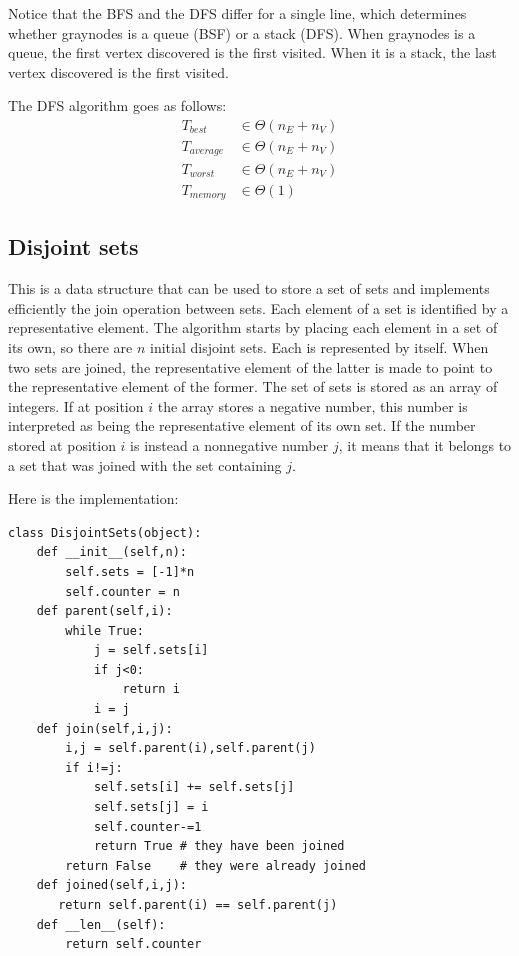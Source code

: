 \documentclass[justified,sixbynine]{tufte-book}
\def\ft{\small\tt}
\theoremstyle{plain}%
\theoremstyle{definition}
\theoremstyle{remark}
\begin{document}
\begin{fullwidth}
Notice that the BFS and the DFS differ for a single line, which determines whether graynodes is a queue (BSF) or a stack (DFS). When graynodes is a queue, the first vertex discovered is the first visited. When it is a stack, the last vertex discovered is the first visited.

The DFS algorithm goes as follows:
\begin{align}
T_{best} &\in \Theta (n_E+n_V) \\
T_{average} &\in \Theta (n_E+n_V) \\
T_{worst} &\in \Theta (n_E+n_V) \\
T_{memory} &\in \Theta (1)
\end{align}

\subsection{Disjoint sets}


This is a data structure that can be used to store a set of sets and implements efficiently the join operation between sets.
Each element of a set is identified by a representative element. The algorithm starts by placing each element in a set of its own, so there are $n$ initial disjoint sets. Each is represented by itself. When two sets are joined, the representative element of the latter is made to point to the representative element of the former. The set of sets is stored as an array of integers. If at position $i$ the array stores a negative number, this number is interpreted as being the representative element of its own set. If the number stored at position $i$ is instead a nonnegative number $j$, it means that it belongs to a set that was joined with the set containing $j$.

Here is the implementation:


\begin{lstlisting}[caption={in file: {\ft nlib.py}}]
class DisjointSets(object):
    def __init__(self,n):
        self.sets = [-1]*n
        self.counter = n
    def parent(self,i):
        while True:
            j = self.sets[i]
            if j<0:
                return i
            i = j
    def join(self,i,j):
        i,j = self.parent(i),self.parent(j)
        if i!=j:
            self.sets[i] += self.sets[j]
            self.sets[j] = i
            self.counter-=1
            return True # they have been joined
        return False    # they were already joined
    def joined(self,i,j):
       return self.parent(i) == self.parent(j)
    def __len__(self):
        return self.counter
\end{lstlisting}


\end{fullwidth}
\end{document}
